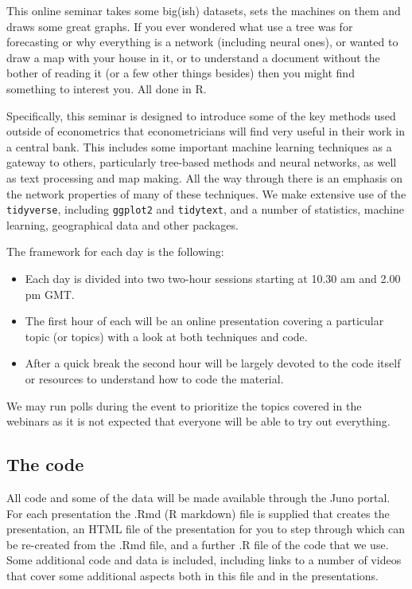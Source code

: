 \documentclass[
  letterpaper,
]{book}
\providecommand{\tightlist}{%
  \setlength{\itemsep}{0pt}\setlength{\parskip}{0pt}}\usepackage{longtable,booktabs,array}
\begin{document}
This online seminar takes some big(ish) datasets, sets the machines on
them and draws some great graphs. If you ever wondered what use a tree
was for forecasting or why everything is a network (including neural
ones), or wanted to draw a map with your house in it, or to understand a
document without the bother of reading it (or a few other things
besides) then you might find something to interest you. All done in R.

Specifically, this seminar is designed to introduce some of the key
methods used outside of econometrics that econometricians will find very
useful in their work in a central bank. This includes some important
machine learning techniques as a gateway to others, particularly
tree-based methods and neural networks, as well as text processing and
map making. All the way through there is an emphasis on the network
properties of many of these techniques. We make extensive use of the
\texttt{tidyverse}, including \texttt{ggplot2} and \texttt{tidytext},
and a number of statistics, machine learning, geographical data and
other packages.

The framework for each day is the following:

\begin{itemize}
\tightlist
\item
  Each day is divided into two two-hour sessions starting at 10.30 am
  and 2.00 pm GMT.
\item
  The first hour of each will be an online presentation covering a
  particular topic (or topics) with a look at both techniques and code.
\item
  After a quick break the second hour will be largely devoted to the
  code itself or resources to understand how to code the material.
\end{itemize}

We may run polls during the event to prioritize the topics covered in
the webinars as it is not expected that everyone will be able to try out
everything.

\hypertarget{the-code}{%
\subsection{The code}\label{the-code}}

All code and some of the data will be made available through the Juno
portal. For each presentation the .Rmd (R markdown) file is supplied
that creates the presentation, an HTML file of the presentation for you
to step through which can be re-created from the .Rmd file, and a
further .R file of the code that we use. Some additional code and data
is included, including links to a number of videos that cover some
additional aspects both in this file and in the presentations.
\end{document}
